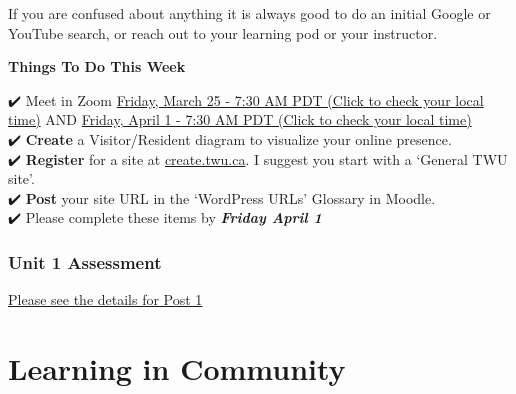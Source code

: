 \documentclass[
]{book}
\begin{document}
If you are confused about anything it is always good to do an initial Google or YouTube search, or reach out to your learning pod or your instructor.

\begin{todo}
\textbf{Things To Do This Week}

✔️ Meet in Zoom
\href{https://www.timeanddate.com/worldclock/fixedtime.html?msg=LDRS663+Meeting\&iso=20220325T0730\&p1=1109}{Friday,
March 25 - 7:30 AM PDT (Click to check your local time)} AND
\href{https://www.timeanddate.com/worldclock/fixedtime.html?msg=LDRS663+Meeting\&iso=20220401T0730\&p1=1109\&ah=1\&am=30}{Friday,
April 1 - 7:30 AM PDT (Click to check your local time)}\\
✔️ \textbf{Create} a Visitor/Resident diagram to visualize your online
presence.\\
✔️ \textbf{Register} for a site at
\href{https://create.twu.ca}{create.twu.ca}. I suggest you start with a
`General TWU site'.\\
✔️ \textbf{Post} your site URL in the `WordPress URLs' Glossary in
Moodle.\\
✔️ Please complete these items by \textbf{\emph{Friday April 1}}
\end{todo}

\hypertarget{unit-1-assessment}{%
\subsection{Unit 1 Assessment}\label{unit-1-assessment}}

\href{https://ma-lead.github.io/ldrs663/assessments}{Please see the details for Post 1}

\hypertarget{learning-in-community}{%
\chapter{Learning in Community}\label{learning-in-community}}
\end{document}
